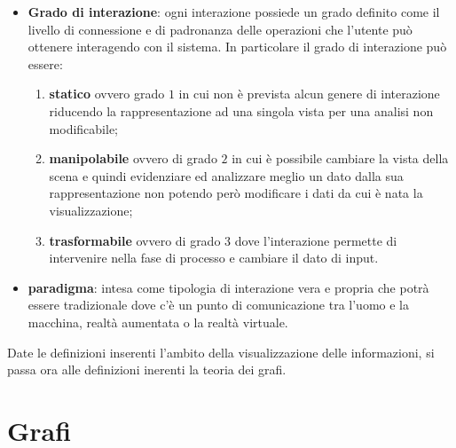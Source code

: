 {\begin{itemize}
	\item \textbf{Grado di interazione}: ogni interazione possiede un grado definito come il livello di connessione e di padronanza delle operazioni che l'utente può ottenere interagendo con il sistema. In particolare il grado di interazione può essere:
	\begin{enumerate}
		\item \textbf{statico} ovvero grado $1$ in cui non è prevista alcun genere di interazione riducendo la rappresentazione ad una singola vista per una analisi non modificabile;
		\item \textbf{manipolabile} ovvero di grado $2$ in cui è possibile cambiare la vista della scena e quindi evidenziare ed analizzare meglio un dato dalla sua rappresentazione non potendo però modificare i dati da cui è nata la visualizzazione;
		\item \textbf{trasformabile} ovvero di grado $3$ dove l’interazione permette di intervenire nella fase di processo e cambiare il dato di input.
	\end{enumerate}
	\item \textbf{paradigma}: intesa come tipologia di interazione vera e propria che potrà essere tradizionale dove c’è un punto di comunicazione tra l’uomo e la macchina, realtà aumentata o la realtà virtuale.
\end{itemize}
Date le definizioni inserenti l'ambito della visualizzazione delle informazioni, si passa ora alle definizioni inerenti la teoria dei grafi.
\section{Grafi}

}
